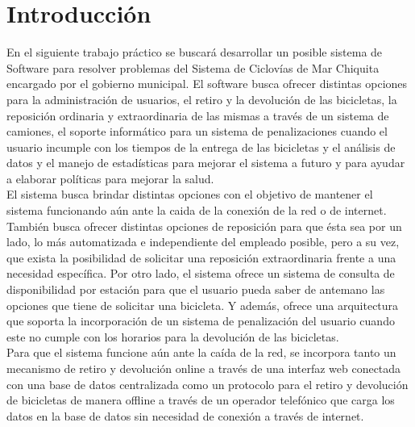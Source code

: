\documentclass[a4paper, 11pt, spanish]{article}
\begin{document}
\pagestyle{myheadings}
\maketitle

\thispagestyle{empty}
\tableofcontents

\newpage

\section{Introducción}

En el siguiente trabajo práctico se buscará desarrollar un posible sistema de Software para resolver problemas del Sistema de Ciclovías de Mar Chiquita encargado por el gobierno municipal. El software busca ofrecer distintas opciones para la administración de usuarios, el retiro y la devolución de las bicicletas, la reposición ordinaria y extraordinaria de las mismas a través de un sistema de camiones, el soporte informático para un sistema de penalizaciones cuando el usuario incumple con los tiempos de la entrega de las bicicletas y el análisis de datos y el manejo de estadísticas para mejorar el sistema a futuro y para ayudar a elaborar políticas para mejorar la salud.\\

El sistema busca brindar distintas opciones con el objetivo de mantener el sistema funcionando aún ante la caida de la conexión de la red o de internet. También busca ofrecer distintas opciones de reposición para que ésta sea por un lado, lo más automatizada e independiente del empleado posible, pero a su vez, que exista la posibilidad de solicitar una reposición extraordinaria frente a una necesidad específica. Por otro lado, el sistema ofrece un sistema de consulta de disponibilidad por estación para que el usuario pueda saber de antemano las opciones que tiene de solicitar una bicicleta. Y además, ofrece una arquitectura que soporta la incorporación de un sistema de penalización del usuario cuando este no cumple con los horarios para la devolución de las bicicletas.\\


Para que el sistema funcione aún ante la caída de la red, se incorpora tanto un mecanismo de retiro y devolución online a través de una interfaz web conectada con una base de datos centralizada como un protocolo para el retiro y devolución de bicicletas de manera offline a través de un operador telefónico que carga los datos en la base de datos sin necesidad de conexión a través de internet.\\
\end{document}
